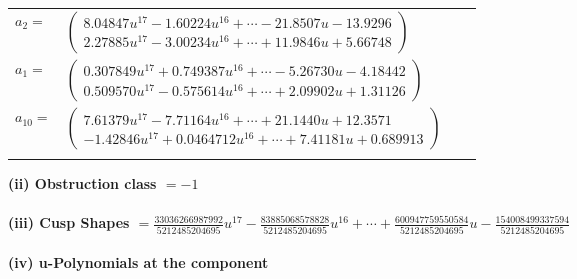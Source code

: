 \documentclass[1p]{elsarticle_modified}
\theoremstyle{definition}
\begin{document}
\begin{tabular}{m{7pt} m{180pt} m{7pt} m{180pt} }
\flushright $a_{2}=$&$\begin{pmatrix}8.04847 u^{17}-1.60224 u^{16}+\cdots-21.8507 u-13.9296\\2.27885 u^{17}-3.00234 u^{16}+\cdots+11.9846 u+5.66748\end{pmatrix}$ \\
\flushright $a_{1}=$&$\begin{pmatrix}0.307849 u^{17}+0.749387 u^{16}+\cdots-5.26730 u-4.18442\\0.509570 u^{17}-0.575614 u^{16}+\cdots+2.09902 u+1.31126\end{pmatrix}$ \\
\flushright $a_{10}=$&$\begin{pmatrix}7.61379 u^{17}-7.71164 u^{16}+\cdots+21.1440 u+12.3571\\-1.42846 u^{17}+0.0464712 u^{16}+\cdots+7.41181 u+0.689913\end{pmatrix}$\\&\end{tabular}
\flushleft \textbf{(ii) Obstruction class $= -1$}\\~\\
\flushleft \textbf{(iii) Cusp Shapes $= \frac{33036266987992}{5212485204695} u^{17}-\frac{83885068578828}{5212485204695} u^{16}+\cdots+\frac{600947759550584}{5212485204695} u-\frac{154008499337594}{5212485204695}$}\\~\\
\newpage\renewcommand{\arraystretch}{1}
\flushleft \textbf{(iv) u-Polynomials at the component}\newline \\
\end{document}
